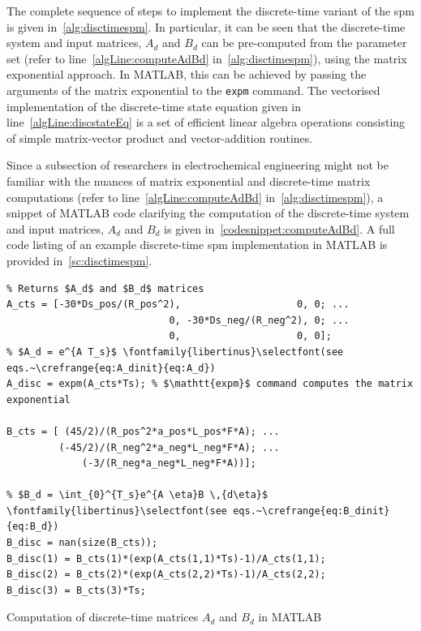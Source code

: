 The complete  sequence of steps  to implement  the discrete-time variant  of the
\gls{spm}  is given  in~\cref{alg:disctimespm}. In  particular, it  can be  seen
that  the discrete-time  system  and  input matrices,  $A_d$  and  $B_d$ can  be
pre-computed  from the  parameter set  (refer to  line~\ref{algLine:computeAdBd}
in~\cref{alg:disctimespm}), using  the matrix  exponential approach.  In MATLAB,
this  can be  achieved by  passing the  arguments of  the matrix  exponential to
the  \verb+expm+ command.  The  vectorised implementation  of the  discrete-time
state equation  given in  line~\ref{algLine:discstateEq} is  a set  of efficient
linear  algebra  operations  consisting  of  simple  matrix-vector  product  and
vector-addition routines.



Since   a    subsection   of   researchers   in    electrochemical   engineering
might   not  be   familiar  with   the   nuances  of   matrix  exponential   and
discrete-time  matrix  computations   (refer  to  line~\ref{algLine:computeAdBd}
in~\cref{alg:disctimespm}),   a   snippet   of  MATLAB   code   clarifying   the
computation  of  the   discrete-time  system  and  input   matrices,  $A_d$  and
$B_d$  is  given  in~\cref{codesnippet:computeAdBd}.  A  full  code  listing  of
an  example  discrete-time  \gls{spm}   implementation  in  MATLAB  is  provided
in~\cref{sc:disctimespm}.

\begin{listing}
\begin{verbatim}
% Returns $A_d$ and $B_d$ matrices
A_cts = [-30*Ds_pos/(R_pos^2),                    0, 0; ...
                            0, -30*Ds_neg/(R_neg^2), 0; ...
                            0,                    0, 0];
% $A_d = e^{A T_s}$ \fontfamily{libertinus}\selectfont(see eqs.~\crefrange{eq:A_dinit}{eq:A_d})
A_disc = expm(A_cts*Ts); % $\mathtt{expm}$ command computes the matrix exponential

B_cts = [ (45/2)/(R_pos^2*a_pos*L_pos*F*A); ...
         (-45/2)/(R_neg^2*a_neg*L_neg*F*A); ...
             (-3/(R_neg*a_neg*L_neg*F*A))];

% $B_d = \int_{0}^{T_s}e^{A \eta}B \,{d\eta}$ \fontfamily{libertinus}\selectfont(see eqs.~\crefrange{eq:B_dinit}{eq:B_d})
B_disc = nan(size(B_cts));
B_disc(1) = B_cts(1)*(exp(A_cts(1,1)*Ts)-1)/A_cts(1,1);
B_disc(2) = B_cts(2)*(exp(A_cts(2,2)*Ts)-1)/A_cts(2,2);
B_disc(3) = B_cts(3)*Ts;
\end{verbatim}
\caption{Computation of discrete-time matrices $A_d$ and $B_d$ in MATLAB}
\label{codesnippet:computeAdBd}
\end{listing}

